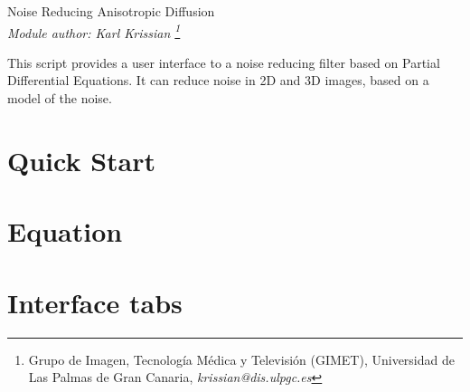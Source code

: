 \documentclass[11pt,a6paper]{report}
\begin{document}
\begin{center}
 { \Large Noise Reducing Anisotropic Diffusion }\\
 \it{ Module author:} Karl Krissian 
\footnote{
Grupo de Imagen, Tecnolog\'ia M\'edica y Televisi\'on (GIMET),
Universidad de Las Palmas de Gran Canaria, {\it krissian@dis.ulpgc.es}
}
\end{center}

This script provides a user interface to a noise reducing filter based on Partial Differential Equations. It can reduce noise in 2D and 3D images, based on a model of the noise.

\section{Quick Start}

\section{Equation}

\section{Interface tabs}



\end{document}
